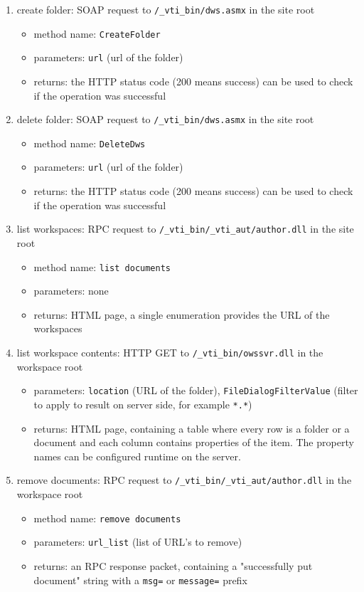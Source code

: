\begin{enumerate}
\item create folder: SOAP request to \texttt{/\_vti\_bin/dws.asmx} in the site root
\begin{itemize}
\item method name: \texttt{CreateFolder}
\item parameters: \texttt{url} (url of the folder)
\item returns: the HTTP status code (200 means success) can be used to check if the operation was successful
\end{itemize}

\item delete folder: SOAP request to \texttt{/\_vti\_bin/dws.asmx} in the site root
\begin{itemize}
\item method name: \texttt{DeleteDws}
\item parameters: \texttt{url} (url of the folder)
\item returns: the HTTP status code (200 means success) can be used to check if the operation was successful
\end{itemize}

\item list workspaces: RPC request to \texttt{/\_vti\_bin/\_vti\_aut/author.dll} in the site root
\begin{itemize}
\item method name: \texttt{list documents}
\item parameters: none
\item returns: HTML page, a single enumeration provides the URL of the workspaces
\end{itemize}

\item list workspace contents: HTTP GET to \texttt{/\_vti\_bin/owssvr.dll} in the workspace root
\begin{itemize}
\item parameters: \texttt{location} (URL of the folder), \texttt{FileDialogFilterValue} (filter to apply to result on server side, for example \texttt{*.*})
\item returns: HTML page, containing a table where every row is a folder or a
document and each column contains properties of the item. The property names
can be configured runtime on the server.
\end{itemize}

\item remove documents: RPC request to \texttt{/\_vti\_bin/\_vti\_aut/author.dll} in the workspace root
\begin{itemize}
\item method name: \texttt{remove documents}
\item parameters: \texttt{url\_list} (list of URL's to remove)
\item returns: an RPC response packet, containing a "successfully put document" string with a \texttt{msg=} or \texttt{message=} prefix
\end{itemize}


\end{enumerate}
